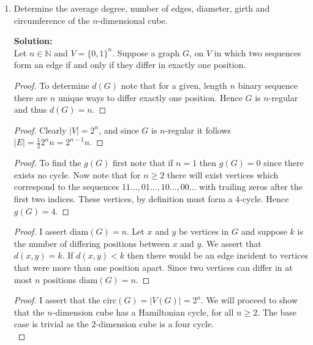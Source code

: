 \documentclass[12pt]{article}
\newcommand\solution{\localhead{Solution:}}
\newcommand{\localhead}[1]{\par\smallskip\textbf{#1}\nobreak\\}%
\newcommand{\bbN}{\mathbb{N}}
\newcommand{\diam}{\text{diam}}
\newcommand{\circumference}{\text{circ}}
\begin{document}
\begin{enumerate}
\begin{enumerate}
			\item Determine the average degree, number of edges, diameter, girth and circumference of the $n$-dimensional cube.
				\solution Let $n \in \bbN$ and $V=\{0,1\}^n.$ Suppose a graph $G$, on $V$ in which two sequences form an edge if and only if they differ in exactly one position. 
					\begin{proof}
					To determine $d(G)$ note that for a given, length $n$ binary sequence there are $n$ unique ways to differ exactly one position. Hence $G$ is $n$-regular and thus $d(G) = n$. 
					\end{proof}
					\vspace{.15in}

					\begin{proof}
						Clearly $|V| = 2^n$, and since $G$ is $n$-regular it follows $|E| = \frac{1}{2}2^nn = 2^{n - 1} n$.
					\end{proof}
					\vspace{.15in}

		
					\begin{proof}
					To find the $g(G)$ first note that if $n = 1$ then $g(G) = 0$ since there exists no cycle. Now note that for $n \geq 2$ there will exist vertices which correspond to the sequences $11\dots, 01\dots, 10\dots, 00\dots$ with trailing zeros after the first two indices. These vertices, by definition must form a 4-cycle. Hence $g(G) = 4$. 
					\end{proof}
					\vspace{.15in}


		\begin{proof} I assert $\diam(G) = n$. Let $x$ and $y$ be vertices in $G$ and suppose 
			$k$ is the number of differing positions between $x$ and $y$. We assert that $d(x, y) = k$. If $d(x, y) < k$ then there would be an edge incident to vertices that were more than one position apart. Since two vertices can differ in at most $n$ positions $\diam(G) = n$. 
			\end{proof}
	\vspace{.15in}


	
		\begin{proof}
		I assert that the $\circumference(G) = |V(G)| = 2^n$. We will proceed to show that the $n$-dimension cube has a Hamiltonian cycle, for all $n \geq 2$. The base case is trivial as the $2$-dimension cube is a four cycle.\\


\end{proof}
\end{enumerate}
\end{enumerate}
\end{document}
